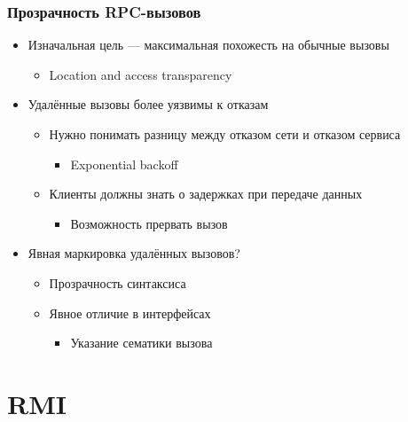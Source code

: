 \documentclass[xetex,mathserif,serif]{beamer}
\begin{document}
    \begin{frame}
        \frametitle{Прозрачность RPC-вызовов}
        \begin{itemize}
            \item Изначальная цель --- максимальная похожесть на обычные вызовы
            \begin{itemize}
                \item Location and access transparency
            \end{itemize}
            \item Удалённые вызовы более уязвимы к отказам
            \begin{itemize}
                \item Нужно понимать разницу между отказом сети и отказом сервиса
                \begin{itemize}
                    \item Exponential backoff
                \end{itemize}
                \item Клиенты должны знать о задержках при передаче данных
                \begin{itemize}
                    \item Возможность прервать вызов
                \end{itemize}
            \end{itemize}
            \item Явная маркировка удалённых вызовов?
            \begin{itemize}
                \item Прозрачность синтаксиса
                \item Явное отличие в интерфейсах
                \begin{itemize}
                    \item Указание сематики вызова
                \end{itemize}
            \end{itemize}
        \end{itemize}
    \end{frame}

    \section{RMI}
\end{document}
